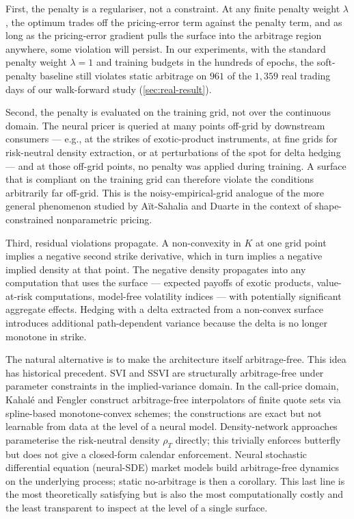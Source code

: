 \documentclass[largeformat]{interact}
\let\cite\citep   %
\theoremstyle{plain}
\theoremstyle{definition}
\begin{document}
First, the penalty is a regulariser, not a constraint. At any finite penalty weight $\lambda$, the optimum trades off the pricing-error term against the penalty term, and as long as the pricing-error gradient pulls the surface into the arbitrage region anywhere, some violation will persist. In our experiments, with the standard penalty weight $\lambda = 1$ and training budgets in the hundreds of epochs, the soft-penalty baseline still violates static arbitrage on $961$ of the $1{,}359$ real trading days of our walk-forward study (\cref{sec:real-result}).

Second, the penalty is evaluated on the training grid, not over the continuous domain. The neural pricer is queried at many points off-grid by downstream consumers --- e.g., at the strikes of exotic-product instruments, at fine grids for risk-neutral density extraction, or at perturbations of the spot for delta hedging --- and at those off-grid points, no penalty was applied during training. A surface that is compliant on the training grid can therefore violate the conditions arbitrarily far off-grid. This is the noisy-empirical-grid analogue of the more general phenomenon studied by Aït-Sahalia and Duarte \citeyearpar{aitsahalia2003nonparametric} in the context of shape-constrained nonparametric pricing.

Third, residual violations propagate. A non-convexity in $K$ at one grid point implies a negative second strike derivative, which in turn implies a negative implied density at that point. The negative density propagates into any computation that uses the surface --- expected payoffs of exotic products, value-at-risk computations, model-free volatility indices --- with potentially significant aggregate effects. Hedging with a delta extracted from a non-convex surface introduces additional path-dependent variance because the delta is no longer monotone in strike.

The natural alternative is to make the architecture itself arbitrage-free. This idea has historical precedent. SVI \cite{gatheral2004parsimonious} and SSVI \cite{gatheral2014arbitrage} are structurally arbitrage-free under parameter constraints in the implied-variance domain. In the call-price domain, Kahalé \citeyearpar{kahale2004arbitrage} and Fengler \citeyearpar{fengler2009arbitrage} construct arbitrage-free interpolators of finite quote sets via spline-based monotone-convex schemes; the constructions are exact but not learnable from data at the level of a neural model. Density-network approaches \cite{horvath2021deep} parameterise the risk-neutral density $\rho_T$ directly; this trivially enforces butterfly but does not give a closed-form calendar enforcement. Neural stochastic differential equation (neural-SDE) market models \cite{cohen2023arbitrage,cohen2023nsde,cuchiero2020generative,gambara2021consistent} build arbitrage-free dynamics on the underlying process; static no-arbitrage is then a corollary. This last line is the most theoretically satisfying but is also the most computationally costly and the least transparent to inspect at the level of a single surface.
\end{document}
